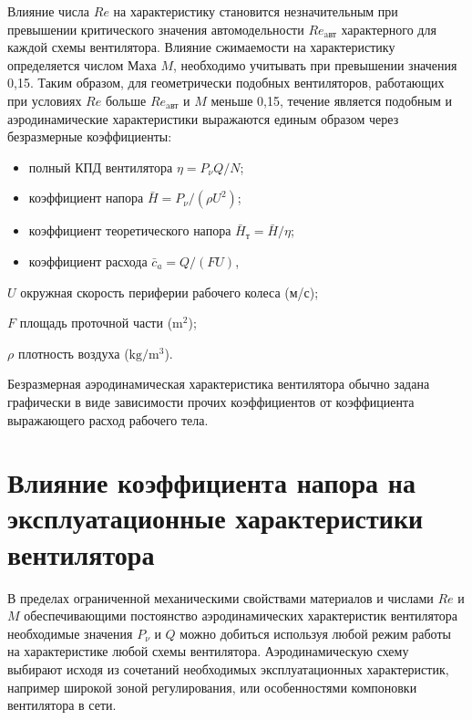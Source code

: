 Влияние числа \(Re\) на характеристику становится незначительным при превышении критического значения автомодельности \(Re_{\text{aвт}}\) характерного для каждой схемы вентилятора. Влияние сжимаемости на характеристику определяется числом Маха \(M\), необходимо учитывать при превышении значения 0,15. 
Таким образом, для геометрически подобных вентиляторов, работающих при условиях \(Re\) больше \(Re_{\text{aвт}}\) и \(M\) меньше 0,15, течение является подобным и аэродинамические характеристики выражаются единым образом через безразмерные коэффициенты:
\begin{itemize}
\item[] полный КПД вентилятора \(\eta = {P_{\nu}Q}/{N}\);
\item[]	коэффициент напора \(\bar{H} = P_{\nu} / (\rho U^2)\);
\item[] коэффициент теоретического напора \( \bar{H}_{\text{т}} = \bar{H} / \eta \);
\item[] коэффициент расхода \(\bar{c}_{a} = Q / (F U)\),
\end{itemize}
\begin{eqexpl}
	\item {\(U\)} окружная скорость периферии рабочего колеса (м/с);
	\item {\(F\)} площадь проточной части (\(\si{\meter}^2\));
	\item {\(\rho\)} плотность воздуха (\(\si{\kilogram}/\si{\meter}^3\)).
\end{eqexpl}	
Безразмерная аэродинамическая характеристика вентилятора обычно задана графически в виде зависимости прочих коэффициентов от коэффициента выражающего расход рабочего тела.

\section{Влияние коэффициента напора на эксплуатационные характеристики вентилятора}\label{ch1/sec2}

В пределах ограниченной механическими свойствами материалов и числами \(Re\) и \(M\) обеспечивающими постоянство аэродинамических характеристик вентилятора необходимые значения \(P_\nu\) и \(Q\) можно добиться используя любой режим работы на характеристике любой схемы вентилятора. Аэродинамическую схему выбирают исходя из сочетаний необходимых эксплуатационных характеристик, например широкой зоной регулирования, или особенностями компоновки вентилятора в сети. 

